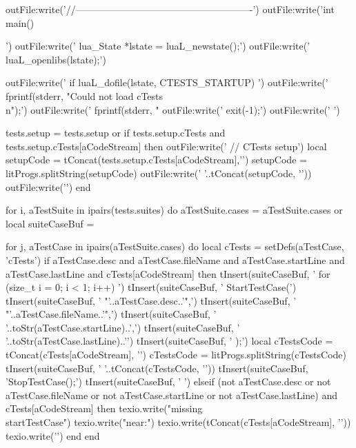   outFile:write('//-------------------------------------------------------\n')
  outFile:write('int main(){\n\n')
  outFile:write('  lua_State *lstate = luaL_newstate();\n')
  outFile:write('  luaL_openlibs(lstate);\n\n')

  outFile:write('  if luaL_dofile(lstate, CTESTS_STARTUP) {\n')
  outFile:write('    fprintf(stderr, "Could not load cTests\\n");\n')
  outFile:write('    fprintf(stderr, "%
  outFile:write('    exit(-1);\n')
  outFile:write('  }\n\n')

  tests.setup = tests.setup or { }
  if tests.setup.cTests and
    tests.setup.cTests[aCodeStream] then
    outFile:write('  // CTests setup\n')
    local setupCode = tConcat(tests.setup.cTests[aCodeStream],'\n')
    setupCode       = litProgs.splitString(setupCode)
    outFile:write('  '..tConcat(setupCode, '\n  '))
    outFile:write('\n\n')
  end

  for i, aTestSuite in ipairs(tests.suites) do
    aTestSuite.cases = aTestSuite.cases or { }
    local suiteCaseBuf = { }

    for j, aTestCase in ipairs(aTestSuite.cases) do
      local cTests     = setDefs(aTestCase, 'cTests')
      if aTestCase.desc and
        aTestCase.fileName and
        aTestCase.startLine and
        aTestCase.lastLine and
        cTests[aCodeStream] then
        tInsert(suiteCaseBuf, '    for (size_t i = 0; i < 1; i++) {\n\n')
        tInsert(suiteCaseBuf, '      StartTestCase(\n')
        tInsert(suiteCaseBuf, '        "'..aTestCase.desc..'",\n')
        tInsert(suiteCaseBuf, '        "'..aTestCase.fileName..'",\n')
        tInsert(suiteCaseBuf, '        '..toStr(aTestCase.startLine)..',\n')
        tInsert(suiteCaseBuf, '        '..toStr(aTestCase.lastLine)..'\n')
        tInsert(suiteCaseBuf, '      );\n\n  ')
        local cTestsCode = tConcat(cTests[aCodeStream], '\n')
        cTestsCode       = litProgs.splitString(cTestsCode)
        tInsert(suiteCaseBuf, '    '..tConcat(cTestsCode, '\n      '))
        tInsert(suiteCaseBuf, '\n\n      StopTestCase();\n\n')
        tInsert(suiteCaseBuf, '    }\n\n')
      elseif (not aTestCase.desc or
        not aTestCase.fileName or
        not aTestCase.startLine or
        not aTestCase.lastLine) and
        cTests[aCodeStream] then
        texio.write("\nERROR missing \\startTestCase\n")
        texio.write("near:\n")
        texio.write(tConcat(cTests[aCodeStream], '\n'))
        texio.write('\n')
      end
    end

}

